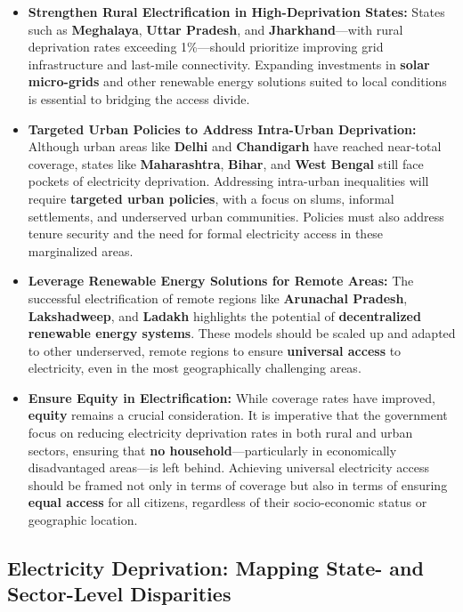 \documentclass{article}
\begin{document}
\begin{itemize}
	\item \textbf{Strengthen Rural Electrification in High-Deprivation States:}  
	States such as \textbf{Meghalaya}, \textbf{Uttar Pradesh}, and \textbf{Jharkhand}—with rural deprivation rates exceeding 1\%—should prioritize improving grid infrastructure and last-mile connectivity. Expanding investments in \textbf{solar micro-grids} and other renewable energy solutions suited to local conditions is essential to bridging the access divide.
	
	\item \textbf{Targeted Urban Policies to Address Intra-Urban Deprivation:}  
	Although urban areas like \textbf{Delhi} and \textbf{Chandigarh} have reached near-total coverage, states like \textbf{Maharashtra}, \textbf{Bihar}, and \textbf{West Bengal} still face pockets of electricity deprivation. Addressing intra-urban inequalities will require \textbf{targeted urban policies}, with a focus on slums, informal settlements, and underserved urban communities. Policies must also address tenure security and the need for formal electricity access in these marginalized areas.
	
	\item \textbf{Leverage Renewable Energy Solutions for Remote Areas:}  
	The successful electrification of remote regions like \textbf{Arunachal Pradesh}, \textbf{Lakshadweep}, and \textbf{Ladakh} highlights the potential of \textbf{decentralized renewable energy systems}. These models should be scaled up and adapted to other underserved, remote regions to ensure \textbf{universal access} to electricity, even in the most geographically challenging areas.
	
	\item \textbf{Ensure Equity in Electrification:}  
	While coverage rates have improved, \textbf{equity} remains a crucial consideration. It is imperative that the government focus on reducing electricity deprivation rates in both rural and urban sectors, ensuring that \textbf{no household}—particularly in economically disadvantaged areas—is left behind. Achieving universal electricity access should be framed not only in terms of coverage but also in terms of ensuring \textbf{equal access} for all citizens, regardless of their socio-economic status or geographic location.
\end{itemize}




\newpage

\subsection{Electricity Deprivation: Mapping State- and Sector-Level Disparities}
\end{document}
